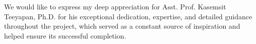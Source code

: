 \iffalse
\begin{dedication}
This document is dedicated to all Chiang Mai University students.

Dedication page is optional.
\end{dedication}
\fi %

\begin{acknowledgments}
We would like to express my deep appreciation for Asst. Prof. Kasemsit Teeyapan, Ph.D. for his exceptional dedication, expertise, and detailed guidance throughout the project, which served as a constant source of inspiration and helped ensure its successful completion.

\end{acknowledgments}%
\fi %

\contentspage

\ifproject
\figurelistpage

\tablelistpage
\fi %



